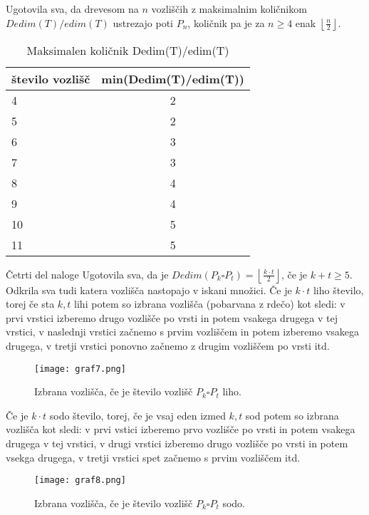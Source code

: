 \documentclass[12pt,a4paper]{amsart}
\makeatletter
\renewcommand\subsection{\@startsection{subsection}{2}%
  \z@{.5\linespacing\@plus.7\linespacing}{.5\linespacing}%
  {\normalfont\scshape}}
\theoremstyle{plain} %
\makeatother
\begin{document}
Ugotovila sva, da drevesom na $n$ vozliščih z maksimalnim količnikom \\
$Dedim(T)/edim(T)$ ustrezajo poti $P_{n}$, količnik pa je za $n\geq 4$ enak $\left\lfloor \frac{n}{2} \right\rfloor $.

\begin{table}[h]
    \begin{center}
      \begin{tabular}{l|c} %
        \textbf{število vozlišč} & \textbf{min(Dedim(T)/edim(T))} \\
        \hline
        4 & 2 \\
        5 & 2 \\
        6 & 3 \\
        7 & 3 \\
        8 & 4 \\
        9 & 4 \\
        10 & 5 \\
        11 & 5 \\
      \end{tabular}
    \end{center}
    \caption{Maksimalen količnik Dedim(T)/edim(T)}
    \label{tab:tabela4}
\end{table}

\subsection{Četrti del naloge}
Ugotovila sva, da je $Dedim(P_{k}\square P_{t}) = \left\lfloor \frac{k\cdot t}{2} \right\rfloor$, če je $k+t \geq 5$. Odkrila sva tudi katera vozlišča nastopajo v iskani množici. 
Če je $k\cdot t$ liho število, torej če sta $k,t$ lihi potem so izbrana vozlišča (pobarvana z rdečo) kot sledi: v prvi vrstici izberemo drugo vozlišče po vrsti in potem vsakega drugega v tej vrstici, v naslednji vrstici začnemo s prvim vozliščem in potem izberemo vsakega drugega, v tretji vrstici ponovno začnemo z drugim vozliščem po vrsti itd.

\bigskip
\begin{figure}[h]
    \centering
    \texttt{[image: graf7.png]}
    \caption{Izbrana vozlišča, če je število vozlišč $P_{k}\square P_{t}$ liho.}
    \label{fig:slika2}
\end{figure}

\bigskip
Če je $k\cdot t$ sodo število, torej, če je vsaj eden izmed $k,t$ sod potem so izbrana vozlišča kot sledi: v prvi vstici izberemo prvo vozlišče po vrsti in potem vsakega drugega v tej vrstici, v drugi vrstici izberemo drugo vozlišče po vrsti in potem vsekga drugega, v tretji vrstici spet začnemo s prvim vozliščem itd.
\bigskip
\begin{figure}[h]
    \centering
    \texttt{[image: graf8.png]}
    \caption{Izbrana vozlišča, če je število vozlišč $P_{k}\square P_{t}$ sodo.}
    \label{fig:slika3}
\end{figure}
\end{document}
